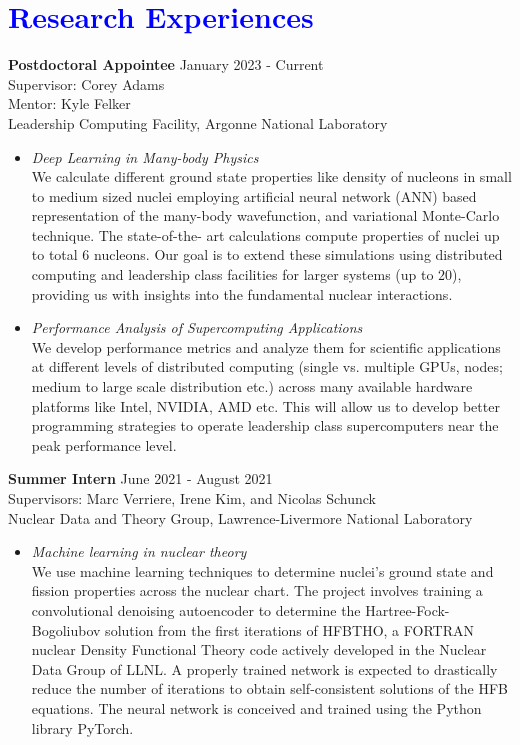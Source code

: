 \documentclass[10pt,fleqn]{scrartcl}
\begin{document}
\section*{\textcolor{blue}{Research Experiences}}
\noindent
\textbf{Postdoctoral Appointee} \hfill{January 2023 - Current}\\
Supervisor: Corey Adams \\
Mentor: Kyle Felker \\
Leadership Computing Facility, Argonne National Laboratory
\begin{itemize}
\item \textit{Deep Learning in Many-body Physics}\\
    We calculate different ground state properties like 
        density of nucleons in small to medium sized nuclei employing 
        artificial neural network (ANN) based representation of the many-body
        wavefunction, and variational Monte-Carlo technique. The state-of-the-
        art calculations compute properties of nuclei up to total $6$ nucleons.
        Our goal is to extend these simulations using distributed computing and
        leadership class facilities for larger systems (up to $20$), providing
        us with insights into the fundamental nuclear interactions. 

\item \textit{Performance Analysis of Supercomputing Applications} \\
    We develop performance metrics and analyze them for scientific
        applications at different levels of distributed computing (single vs. 
        multiple GPUs, nodes; medium to large scale distribution etc.) 
        across many available hardware platforms like Intel, NVIDIA, AMD etc. 
        This will allow us to develop better programming strategies to operate
        leadership class supercomputers near the peak performance level.
\end{itemize}
\noindent
\textbf{Summer Intern} \hfill June 2021 - August 2021\\
Supervisors: Marc Verriere, Irene Kim, and Nicolas Schunck\\
Nuclear Data and Theory Group, Lawrence-Livermore National Laboratory
\begin{itemize}
\item \textit{Machine learning in nuclear theory}\\
    We use machine learning techniques to determine nuclei's ground state 
    and fission properties across the nuclear chart. The project involves 
    training a convolutional denoising 
    autoencoder to determine the Hartree-Fock-Bogoliubov solution from the 
    first iterations of HFBTHO, a FORTRAN nuclear Density Functional Theory 
    code actively developed in the Nuclear Data Group of LLNL. A properly 
    trained network is expected to drastically reduce the number of iterations 
    to obtain 
    self-consistent solutions of the HFB equations. The neural network is 
    conceived and trained using the Python library PyTorch.   
\end{itemize}
\end{document}
